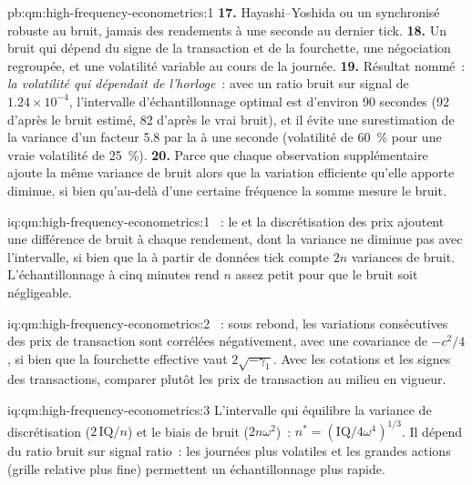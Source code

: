 \begin{solution}{pb:qm:high-frequency-econometrics:1}
\textbf{17.} Hayashi--Yoshida ou un  synchronisé robuste au bruit, jamais des rendements à une seconde au dernier tick.
\textbf{18.} Un bruit qui dépend du signe de la transaction et de la fourchette, une négociation regroupée, et une volatilité variable au cours de la journée.
\textbf{19.} Résultat nommé~: \emph{la volatilité qui dépendait de l'horloge}~: avec un ratio bruit sur signal de $1.24 \times 10^{-4}$, l'intervalle d'échantillonnage optimal est d'environ 90 secondes (92
d'après le bruit estimé, 82 d'après le vrai bruit), et il évite une surestimation de la variance d'un facteur 5.8 par la  à une seconde (volatilité de 60~\% pour une vraie volatilité de 25~\%).
\textbf{20.} Parce que chaque observation supplémentaire ajoute la même variance de bruit alors que la variation efficiente qu'elle apporte diminue, si bien qu'au-delà d'une certaine fréquence la somme mesure le bruit.
\end{solution}

\begin{solution}{iq:qm:high-frequency-econometrics:1}
~: le  et la discrétisation des prix ajoutent une différence de bruit à chaque rendement, dont la variance ne diminue pas avec l'intervalle, si bien que la 
à partir de données tick compte $2n$ variances de bruit. L'échantillonnage à cinq minutes rend $n$ assez petit pour que le bruit soit négligeable.
\end{solution}

\begin{solution}{iq:qm:high-frequency-econometrics:2}
~: sous rebond, les variations consécutives des prix de transaction sont corrélées négativement, avec une covariance de $-c^2/4$, si bien que la fourchette effective vaut $2\sqrt{-\gamma_1}$. Avec les cotations et les
signes des transactions, comparer plutôt les prix de transaction au milieu en vigueur.
\end{solution}

\begin{solution}{iq:qm:high-frequency-econometrics:3}
L'intervalle qui équilibre la variance de discrétisation ($2\,\mathrm{IQ}/n$) et le biais de bruit ($2n\omega^2$)~: $n^* = (\mathrm{IQ}/4\omega^4)^{1/3}$. Il dépend du ratio bruit sur signal
ratio~: les journées plus volatiles et les grandes actions (grille relative plus fine) permettent un échantillonnage plus rapide.
\end{solution}

